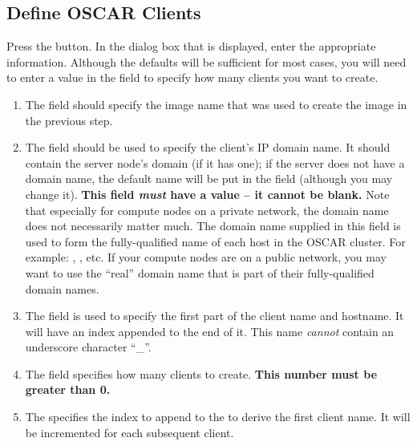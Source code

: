 \subsection{Define OSCAR Clients}
\label{det:define-clients}

Press the  button.  In the dialog box
that is displayed, enter the appropriate information.  Although the
defaults will be sufficient for most cases, you will need to enter a
value in the  field to specify how many clients
you want to create.

\begin{enumerate}
  
\item The  field should specify the image name that
  was used to create the image in the previous step.
  
\item The  field should be used to specify the
  client's IP domain name.  
%
  It should contain the server node's domain (if it has one); if the
  server does not have a domain name, the default name
   will be put in the field (although you may
  change it).
%
  {\bf This field \emph{must} have a value -- it cannot be blank.}
%
  Note that especially for compute nodes on a private network, the
  domain name does not necessarily matter much.  The domain name
  supplied in this field is used to form the fully-qualified name of
  each host in the OSCAR cluster.  For example:
  ,
  , etc.  If your compute nodes are
  on a public network, you may want to use the ``real'' domain name
  that is part of their fully-qualified domain names.

\item The  field is used to specify the first part of
  the client name and hostname. It will have an index appended to the
  end of it. This name \emph{cannot} contain an underscore 
  character ``\_''.

\item The  field specifies how many clients to
  create.  {\bf This number must be greater than 0.}
  
\item The  specifies the index to append to the
   to derive the first client name. It will be
  incremented for each subsequent client.


\end{enumerate}
